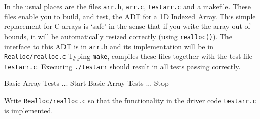 In the usual places are the files \verb^arr.h^, \verb^arr.c^, \verb^testarr.c^
and a makefile. These files enable you to build, and test, the
ADT for a 1D Indexed Array. This simple replacement for C arrays is
`safe' in the sense that if you write the array out-of-bounds, it
will be automatically resized correctly (using \verb^realloc()^). The
interface to this ADT is in \verb^arr.h^ and its implementation will be in \verb^Realloc/realloc.c^
Typing \verb^make^, compiles these files together with the test
file \verb^testarr.c^. Executing \verb^./testarr^ should result in all
tests passing correctly.

\begin{terminaloutput}
Basic Array Tests ... Start
Basic Array Tests ... Stop
\end{terminaloutput}

\begin{exercise}
\label{ex:indarray}
Write \verb^Realloc/realloc.c^ so that the functionality in the driver code \verb^testarr.c^ is implemented.
\end{exercise}
